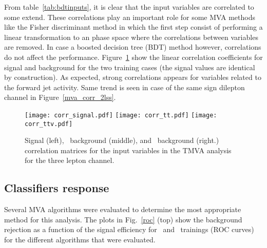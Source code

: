 From table~\ref{tab:bdtinputs}, it is clear that the input variables are correlated to some extend. These correlations play an important role for some MVA methods like the Fisher discriminant method in which the first step consist of performing a linear transformation to an phase space where the correlations between variables are removed. In case a boosted decision tree (BDT) method however, correlations do not affect the performance. Figure~\ref{mva_corr} show the linear correlation coefficients for signal and background for the two training cases (the signal values are identical by construction). As expected, strong correlations appears for variables related to the forward jet activity. Same trend is seen in case of the same sign dilepton channel in Figure~\ref{mva_corr_2lss}.

\begin{figure} [!h]
  \centering
   \texttt{[image: corr\_signal.pdf]}
   \texttt{[image: corr\_tt.pdf]}
   \texttt{[image: corr\_ttv.pdf]}

\caption[Correlation matrices for the input variables in the TMVA.]{ Signal (left), \ttbar\ background (middle), and \ttV\ background (right.) correlation matrices for the input variables in the TMVA analysis for the three lepton channel.}
\label{mva_corr}
\end{figure}


\subsection{Classifiers response}
Several MVA algorithms were evaluated to determine the most appropriate method for this analysis. The plots in Fig.~\ref{roc} (top) show the background rejection as a function of the signal efficiency for \ttbar\ and \ttV\ trainings (ROC curves) for the different algorithms that were evaluated.

